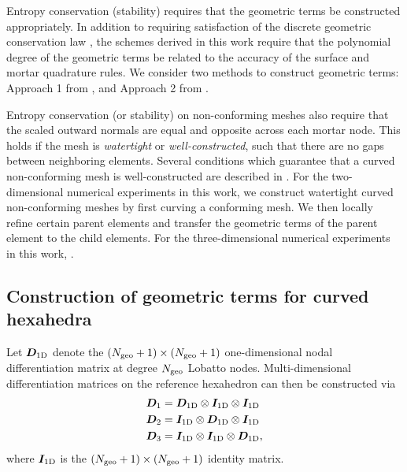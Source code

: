 \documentclass{svjour3}                     %
\renewcommand{\note}[1]{{\color{blue}{#1}}}
\begin{document}
Entropy conservation (stability) requires that the geometric terms be constructed appropriately.  In addition to requiring satisfaction of the discrete geometric conservation law \cite{kopriva2006metric, crean2018entropy, chan2018discretely}, the schemes derived in this work require that the polynomial degree of the geometric terms be related to the accuracy of the surface and mortar quadrature rules.  We consider two methods to construct geometric terms: Approach 1 from \cite{kopriva2006metric}, and Approach 2 from \cite{kozdon2018energy}.  

Entropy conservation (or stability) on non-conforming meshes also require that the scaled outward normals are equal and opposite across each mortar node.  This holds if the mesh is \emph{watertight} or \emph{well-constructed}, such that there are no gaps between neighboring elements.  Several conditions which guarantee that a curved non-conforming mesh is well-constructed are described in \cite{kopriva2019free}.  For the two-dimensional numerical experiments in this work, we construct watertight curved non-conforming meshes by first curving a conforming mesh.  We then locally refine certain parent elements and transfer the geometric terms of the parent element to the child elements.  For the three-dimensional numerical experiments in this work, \note{finish}.

\subsection{Construction of geometric terms for curved hexahedra}


Let $\bm{D}_{\rm 1D}$ denote the $(N_{\rm geo}+1) \times (N_{\rm geo}+1)$ one-dimensional nodal differentiation matrix at degree $N_{\rm geo}$ Lobatto nodes.  Multi-dimensional differentiation matrices on the reference hexahedron can then be constructed via
\begin{align*}
\bm{D}_1 &= \bm{D}_{\rm 1D} \otimes \bm{I}_{\rm 1D}\otimes \bm{I}_{\rm 1D}\\
\bm{D}_2 &= \bm{I}_{\rm 1D} \otimes \bm{D}_{\rm 1D}\otimes \bm{I}_{\rm 1D}\\
\bm{D}_3 &= \bm{I}_{\rm 1D} \otimes \bm{I}_{\rm 1D}\otimes \bm{D}_{\rm 1D},
\end{align*}
where $\bm{I}_{\rm 1D}$ is the $(N_{\rm geo}+1) \times (N_{\rm geo}+1)$ identity matrix.  
\end{document}
